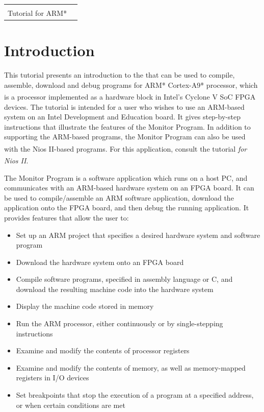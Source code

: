 \documentclass[11pt, twoside, pdftex]{article}
\title{\fontfamily{phv}\selectfont{\doctitle} }
\newcommand{\doctitle}{\productNameMed{} \\ Tutorial for ARM*}
\begin{document}
\begin{table}
    \centering
    \begin{tabular}{p{5cm}p{4cm}}
        \hspace{-3cm}
        &
        \raisebox{1\height}{\parbox[h]{0.5\textwidth}{\Large{}\selectfont{\textsf{\doctitle}}}}
    \end{tabular}
    \label{tab:logo}
\end{table}

\colorbox[rgb]{0,0.384,0.816}{\parbox[h]{\textwidth}{\color{white}\textsf{\textit{\textBar}}}}

\thispagestyle{plain}
 
\section{Introduction}
\label{sec:1}

This tutorial presents an introduction to the \productNameMed{} that can be used to compile, assemble, download and
debug programs for ARM* Cortex-A9*
processor, which is a processor implemented as a hardware block
in Intel's Cyclone\textsuperscript{\textregistered} V SoC 
FPGA devices.
The tutorial is intended for a user who wishes to use an ARM-based system on an Intel Development and Education board.
It gives step-by-step instructions that illustrate
the features of the Monitor Program.
In addition to supporting the ARM-based programs, the
Monitor Program can also be used with the Nios\textsuperscript{\textregistered} II-based
programs. For this application, consult the tutorial
{\it \productNameMed{} for Nios\textsuperscript{\textregistered} II}.

The Monitor Program is a software application which runs on a host PC, and communicates with an ARM-based hardware system on an
FPGA board. It can be used to compile/assemble an ARM
software application, download the application onto the FPGA
board, and then debug the running application.  
It provides features that allow the user to:

\begin{itemize}
    \item Set up an ARM project that specifies a desired hardware system and software program
    \item Download the hardware system onto an FPGA board
    \item Compile software programs, specified in assembly language or C, and download the resulting machine code into the
hardware system
    \item Display the machine code stored in memory
    \item Run the ARM processor, either continuously or by single-stepping instructions
    \item Examine and modify the contents of processor registers
    \item Examine and modify the contents of memory, as well as memory-mapped registers in I/O devices
    \item Set breakpoints that stop the execution of a program at a specified address, or when certain conditions are met
\end{itemize}
\end{document}
